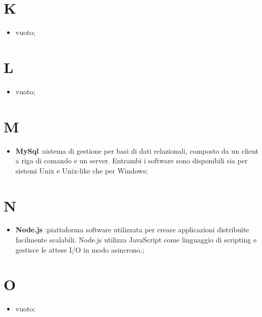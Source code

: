 %


\section*{K} %
\label{sec:k}
	\begin{itemize}
		\item vuoto;
	\end{itemize}

\section*{L} %
\label{sec:l}
	\begin{itemize}
		\item vuoto;
	\end{itemize}

\section*{M} %
\label{sec:m}
	\begin{itemize}
		\item \textbf{MySql} :sistema di gestione per basi di dati relazionali, composto da un client a riga di comando e un server. Entrambi i software sono disponibili sia per sistemi Unix e Unix-like che per Windows;
	\end{itemize}

\section*{N} %
\label{sec:n}
	\begin{itemize}
		\item \textbf{Node.js} :piattaforma software utilizzata per creare applicazioni distribuite facilmente scalabili. Node.js utilizza JavaScript come linguaggio di scripting e gestisce le attese I/O in modo asincrono.;
	\end{itemize}

\section*{O} %
\label{sec:o}
	\begin{itemize}
		\item vuoto;
	\end{itemize}
